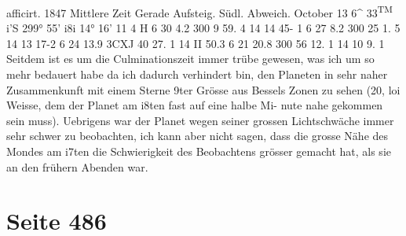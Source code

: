\documentclass[10pt,a4paper]{article}
\begin{document}
afficirt.
1847
Mittlere  Zeit
Gerade  Aufsteig.
Südl.  Abweich.
October  13
6\glqq{}\textasciicircum{}  33\textsuperscript{TM}    i'S
299°  55'    i8\glqq{}i
14°  16'    11 \glqq{}4
H
6     30       4.2
300      9    59. 4
14    14    45- 1
6     27       8.2
300    25       1. 5
14    13     17-2
6     24     13.9
3CXJ    40    27. 1
14    II    50.3
6     21     20.8
300    56    12. 1
14    10      9. 1
Seitdem  ist  es  um  die  Culminationszeit  immer  trübe  gewesen,  was  ich  um  so  mehr  bedauert  habe
da  ich  dadurch  verhindert  bin,  den  Planeten  in  sehr  naher  Zusammenkunft  mit  einem  Sterne  9ter
Grösse  aus  Bessels  Zonen  zu  sehen  (20,  loi  Weisse,  dem  der  Planet  am  i8ten  fast  auf  eine  halbe  Mi-
nute nahe  gekommen  sein  muss).  Uebrigens  war  der  Planet  wegen  seiner  grossen  Lichtschwäche  immer
sehr  schwer  zu  beobachten,  ich  kann  aber  nicht  sagen,  dass  die  grosse  Nähe  des  Mondes  am  i7ten  die
Schwierigkeit  des  Beobachtens  grösser  gemacht  hat,  als  sie  an  den  frühern  Abenden  war.

\newpage
\section*{Seite 486}
\end{document}
